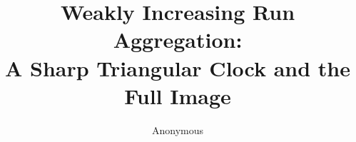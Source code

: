 \documentclass[a4paper,11pt]{article}
\title{Weakly Increasing Run Aggregation:\\A Sharp Triangular Clock and the Full Image}
\author{Anonymous}
\date{}
\begin{document}
\maketitle
\begin{abstract}

\end{abstract}








\end{document}
